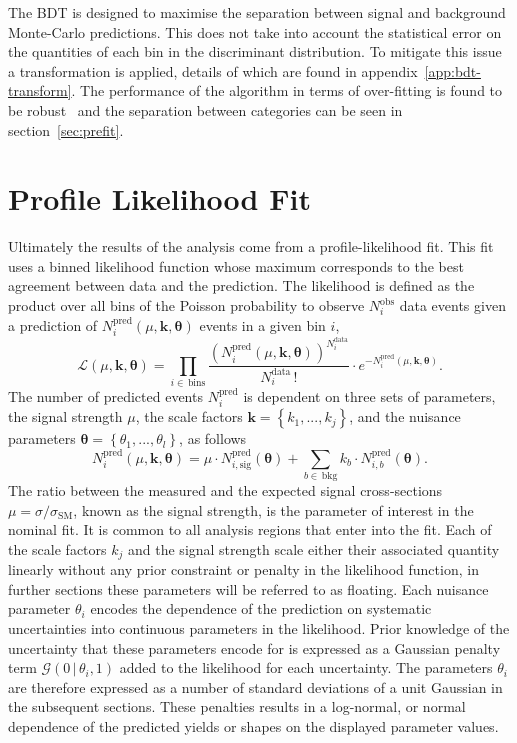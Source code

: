 The BDT is designed to maximise the separation between signal and background
Monte-Carlo predictions. This does not take into account the statistical error
on the quantities of each bin in the discriminant distribution. To mitigate this
issue a transformation is applied, details of which are found in
appendix~\ref{app:bdt-transform}. The performance of the algorithm in terms of
over-fitting is found to be robust~\cite{VHMainNote2019} and the separation
between categories can be seen in section~\ref{sec:prefit}.

\section{Profile Likelihood Fit}%
\label{sec:plf}

Ultimately the results of the analysis come from a profile-likelihood fit. This
fit uses a binned likelihood function whose maximum corresponds to the best
agreement between data and the prediction. The likelihood is defined as the
product over all bins of the Poisson probability to observe $N^{\text{obs}}_i$
data events given a prediction of $N^{\text{pred}}_i(\mu,\bm{k},{\bm\theta})$
events in a given bin $i$,
\begin{equation} \mathcal{L}(\mu,{\bm{k},\bm{\theta}}) =
\prod_{i\in\,\text{bins}} \frac{\left( N_{i}^{\text{pred}}(\mu,{\bm{k,\theta}})
\right)^{N_{i}^{\text{data}}}}{N_{i}^{\text{data}}\,!} \cdot
e^{-N_{i}^{\text{pred}}(\mu,{\bm{k,\theta}})}.
  \label{eq:likelihood}
\end{equation} The number of predicted events $N^{\text{pred}}_i$ is dependent
on three sets of parameters, the signal strength $\mu$, the scale factors
$\bm{k}=\left\{k_1, ...,k_j\right\}$, and the nuisance parameters $\bm{\theta} =
\left\{\theta_1,...,\theta_l\right\}$, as follows
\begin{equation} N_{i}^{\text{pred}}(\mu,\bm{k},\bm{\theta}) = \mu \cdot
N_{i,\text{sig}}^{\text{pred}}(\bm{\theta}) + \sum_{b\in\,\text{bkg}} k_b\cdot
N_{i,b}^{\text{pred}}(\bm{\theta}).
\end{equation} The ratio between the measured and the expected signal
cross-sections $\mu=\sigma/\sigma_{\text{SM}}$, known as the signal strength, is
the parameter of interest in the nominal fit. It is common to all analysis
regions that enter into the fit. Each of the scale factors $k_j$ and the signal
strength scale either their associated quantity linearly without any prior
constraint or penalty in the likelihood function, in further sections these
parameters will be referred to as floating. Each nuisance parameter $\theta_i$
encodes the dependence of the prediction on systematic uncertainties into
continuous parameters in the likelihood. Prior knowledge of the uncertainty that
these parameters encode for is expressed as a Gaussian penalty term
$\mathcal{G}(0\,|\,\theta_i,1)$ added to the likelihood for each uncertainty.
The parameters $\theta_i$ are therefore expressed as a number of standard
deviations of a unit Gaussian in the subsequent sections. These penalties
results in a log-normal, or normal dependence of the predicted yields or shapes
on the displayed parameter values.

